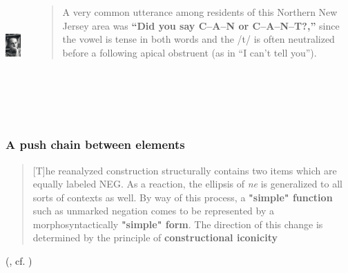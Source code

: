 \documentclass[compress]{beamer}
\begin{document}
\begin{frame}
\frametitle{  }
\begin{columns}[T]  
   \begin{column}{.2\textwidth}
  	  \vspace{12pt}
	  \includegraphics[height=1.2in]{labov.jpg}   
   \end{column}
   \begin{column}{.8\textwidth}
      \begin{block}{}
      \begin{quote}
	A very common utterance among residents of this Northern New Jersey area was \textbf{``Did you say C--A--N or C--A--N--T?,''} since the vowel is tense in both words and the /t/ is often neutralized before a following apical obstruent (as in ``I can't tell you'').
      \end{quote}
	\end{block}
    \end{column}
  \end{columns}
 \vfill\hfill \citep{Labov:2010}\\
 \hfill {}
\end{frame}



\begin{frame}
\frametitle{A push chain between elements}
      \begin{block}{}
      \begin{quote}
[T]he reanalyzed construction structurally contains two items which are equally labeled NEG. As a reaction, the ellipsis of \emph{ne} is generalized to all sorts of contexts as well. By way of this process, a \textbf{"simple" function} such as unmarked negation comes to be represented by a morphosyntactically \textbf{"simple" form}. The direction of this change is determined by the principle of \textbf{constructional iconicity}       
	\end{quote}
	\end{block}
 \vfill\hfill (\citealt{detges-waltereit2002}, cf. \citealt{frisch1997})
\end{frame}
\end{document}
